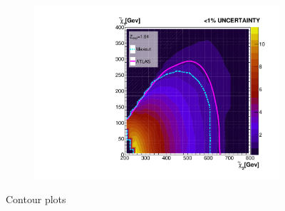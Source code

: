 \begin{figure}[H]
{\begin{subfigure}{.45\textwidth}
        \vspace{-0.75cm}
        \vspace*{-33.1ex}  %
        \begin{center}
        \tiny
        \hspace{-44.5ex}
        \cite{atlas_search_2021}
        \end{center}
        \vspace*{34.1ex}
        \vspace{-1.cm}
        \caption{}
        \label{fig:MaxOutLimit10}
    \end{subfigure}
    \hfill
    \begin{subfigure}{.45\textwidth}
        \includegraphics[width=\textwidth]{Figures/MLResults/NN/SUSY/Comparison/Limits/MaxOutLimit1.pdf}
        \vspace{-0.75cm}
        \vspace*{-33.1ex}  %
        \begin{center}
        \tiny
        \hspace{-44.5ex}
        \cite{atlas_search_2021}
        \end{center}
        \vspace*{34.1ex}
        \vspace{-1.cm}
        \caption{}
        \label{fig:MaxOutLimit1}
    \end{subfigure}
    }
    \caption[Contour plots 
    of the significance achieved by the ordinary dense \acs{NN} and maxout model on the full statistics signal set. Contours are drawn 
    around the band equal to a significance of 1.64 for each model respectively (cyan) and for the \acs{ATLAS} analysis (pink).]{ Contour plots 
}
\end{figure}
